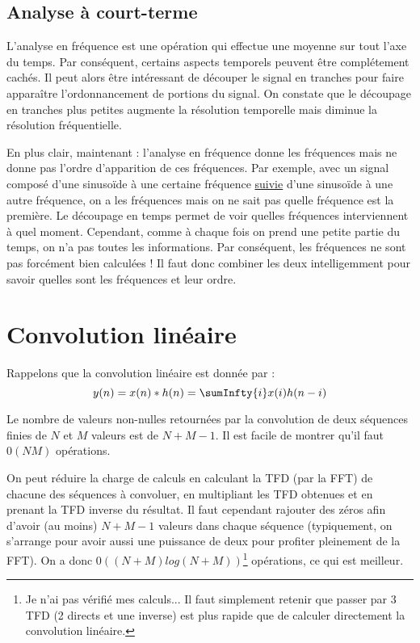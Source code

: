         \subsection{Analyse à court-terme}
            L'analyse en fréquence est une opération qui effectue une moyenne sur tout l'axe du temps. Par conséquent, certains aspects temporels peuvent être complétement cachés. Il peut alors être intéressant de découper le signal en tranches pour faire apparaître l'ordonnancement de portions du signal. On constate que le découpage en tranches plus petites augmente la résolution temporelle mais diminue la résolution fréquentielle.

            En plus clair, maintenant : l'analyse en fréquence donne les fréquences mais ne donne pas l'ordre d'apparition de ces fréquences. Par exemple, avec un signal composé d'une sinusoïde à une certaine fréquence \underline{suivie} d'une sinusoïde à une autre fréquence, on a les fréquences mais on ne sait pas quelle fréquence est la première. Le découpage en temps permet de voir quelles fréquences interviennent à quel moment. Cependant, comme à chaque fois on prend une petite partie du temps, on n'a pas toutes les informations. Par conséquent, les fréquences ne sont pas forcément bien calculées ! Il faut donc combiner les deux intelligemment pour savoir quelles sont les fréquences et leur ordre.

    \section{Convolution linéaire}
        Rappelons que la convolution linéaire est donnée par :
        $$
            y(n) = x(n) * h(n) = \sumInfty{i} x(i)h(n-i)
        $$

        Le nombre de valeurs non-nulles retournées par la convolution de deux séquences finies de $N$ et $M$ valeurs est de $N + M - 1$. Il est facile de montrer qu'il faut $\mathcal{0}(NM)$ opérations.

        On peut réduire la charge de calculs en calculant la TFD (par la FFT) de chacune des séquences à convoluer, en multipliant les TFD obtenues et en prenant la TFD inverse du résultat. Il faut cependant rajouter des zéros afin d'avoir (au moins) $N + M - 1$ valeurs dans chaque séquence (typiquement, on s'arrange pour avoir aussi une puissance de deux pour profiter pleinement de la FFT). On a donc $\mathcal{0}((N+M)log(N+M))$\footnote{Je n'ai pas vérifié mes calculs... Il faut simplement retenir que passer par 3 TFD (2 directs et une inverse) est plus rapide que de calculer directement la convolution linéaire.} opérations, ce qui est meilleur.

